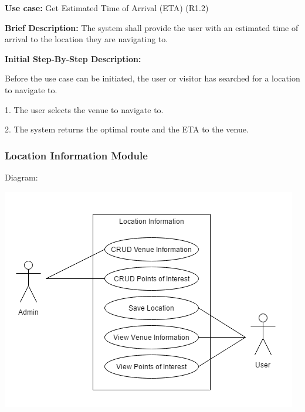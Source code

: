 \documentclass{article}
\begin{document}
    \begin{flushleft}
    \textbf{Use case:} Get Estimated Time of Arrival (ETA) (R1.2)
    \newline
    	
    \textbf{Brief Description:}
    \newline
    The system shall provide the user with an estimated time of arrival to the location they are navigating to.
    \newline
    
    \textbf{Initial Step-By-Step Description:}
    
    Before the use case can be initiated, the user or visitor has searched for a location to navigate to.
	\newline    
	
1. The user selects the venue to navigate to.

2. The system returns the optimal route and the ETA to the venue.

\end{flushleft}
   
   \subsubsection{Location Information Module}
    Diagram:
    
    \includegraphics[scale=.7]{LocationInformation2} 
    
\end{document}
